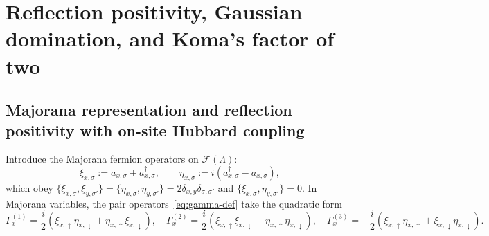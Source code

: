 \documentclass[11pt]{article}
\theoremstyle{definition}
\theoremstyle{remark}
\newcommand{\calF}{\mathcal{F}}
\begin{document}
\section{Reflection positivity, Gaussian domination, and Koma's factor of two}\label{sec:gd}

\subsection{Majorana representation and reflection positivity with on-site Hubbard coupling}\label{subsec:rp}

Introduce the Majorana fermion operators on $\calF(\Lambda)$:
\begin{equation}\label{eq:majorana-def}
\xi_{x,\sigma} := a_{x,\sigma} + a_{x,\sigma}^\dagger, \qquad \eta_{x,\sigma} := i(a_{x,\sigma}^\dagger - a_{x,\sigma}),
\end{equation}
which obey $\{\xi_{x,\sigma}, \xi_{y,\sigma'}\} = \{\eta_{x,\sigma}, \eta_{y,\sigma'}\} = 2\delta_{x,y}\delta_{\sigma,\sigma'}$ and $\{\xi_{x,\sigma}, \eta_{y,\sigma'}\} = 0$. In Majorana variables, the pair operators~\eqref{eq:gamma-def} take the quadratic form
\begin{equation}\label{eq:gamma-majorana}
\Gamma_x^{(1)} = \frac{i}{2}\left(\xi_{x,\uparrow}\eta_{x,\downarrow} + \eta_{x,\uparrow}\xi_{x,\downarrow}\right), \quad
\Gamma_x^{(2)} = \frac{i}{2}\left(\xi_{x,\uparrow}\xi_{x,\downarrow} - \eta_{x,\uparrow}\eta_{x,\downarrow}\right), \quad
\Gamma_x^{(3)} = -\frac{i}{2}\left(\xi_{x,\uparrow}\eta_{x,\uparrow} + \xi_{x,\downarrow}\eta_{x,\downarrow}\right).
\end{equation}
\end{document}
